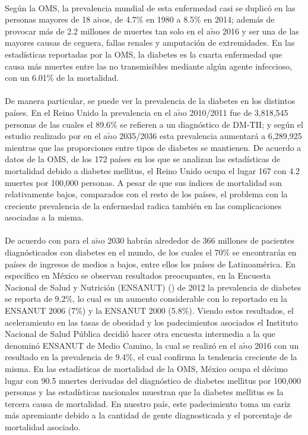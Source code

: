 \\
Seg\'un la OMS, la prevalencia mundial de esta enfermedad casi se duplic\'o en las personas mayores de 18 a$\tilde{n}$os, de 4.7\% en 1980 a 8.5\% en 2014; adem\'as de provocar m\'as de 2.2 millones de muertes tan solo en el a$\tilde{n}$o 2016 y ser una de las mayores causas de ceguera, fallas renales y amputaci\'on de extremidades. En las estad\'isticas reportadas por la OMS, la diabetes es la cuarta enfermedad que causa m\'as muertes entre las no transmisibles mediante alg\'un agente infeccioso, con un 6.01\% de la mortalidad.\\
\\
De manera particular, se puede ver la prevalencia de la diabetes en los distintos pa\'ises. En el Reino Unido la prevalencia en el a$\tilde{n}$o 2010/2011 fue de 3,818,545 personas de las cuales el 89.6\% se refieren a un diagn\'ostico de DM-TII; y seg\'un el estudio realizado por \cite{hex2012estimating} en el a$\tilde{n}$o 2035/2036 esta prevalencia aumentar\'a a 6,289,925 mientras que las proporciones entre tipos de diabetes se mantienen. De acuerdo a datos de la OMS, de los 172 pa\'ises en los que se analizan las estad\'isticas de mortalidad debido a diabetes mellitus, el Reino Unido ocupa el lugar 167 con 4.2 muertes por 100,000 personas. A pesar de que sus \'indices de mortalidad son relativamente bajos, comparados con el resto de los pa\'ises, el problema con la creciente prevalencia de la enfermedad radica tambi\'en en las complicaciones asociadas a la misma.\\
\\
De acuerdo con \cite{bolanos2010costos} para el a$\tilde{n}$o 2030 habr\'an alrededor de 366 millones de pacientes diagn\'osticados con diabetes en el mundo, de los cuales el 70\% se encontrar\'an en pa\'ises de ingresos de medios a bajos, entre ellos los pa\'ises de Latinoam\'erica. En espec\'ifico en M\'exico se observan resultados preocupantes, en la Encuesta Nacional de Salud y Nutrici\'on (ENSANUT) (\cite{gutierrezencuesta}) de 2012 la prevalencia de diabetes se reporta de 9.2\%, lo cual es un aumento considerable con lo reportado en la ENSANUT 2006 (7\%) y la ENSANUT 2000 (5.8\%). Viendo estos resultados, el aceleramiento en las tasas de obesidad y los padecimientos asociados el Instituto Nacional de Salud P\'ublica decidi\'o hacer otra encuesta intermedia a la que denomin\'o ENSANUT de Medio Camino, la cual se realiz\'o en el a$\tilde{n}$o 2016 con un resultado en la prevalencia de 9.4\%, el cual confirma la tendencia creciente de la misma. En las estad\'isticas de mortalidad de la OMS, M\'exico ocupa el d\'ecimo lugar con 90.5 muertes derivadas del diagn\'ostico de diabetes mellitus por 100,000 personas y las estad\'isticas nacionales muestran que la diabetes mellitus es la tercera causa de mortalidad. En nuestro pa\'is, este padecimiento toma un cariz m\'as apremiante debido a la cantidad de gente diagnosticada y el porcentaje de mortalidad asociado.\\
